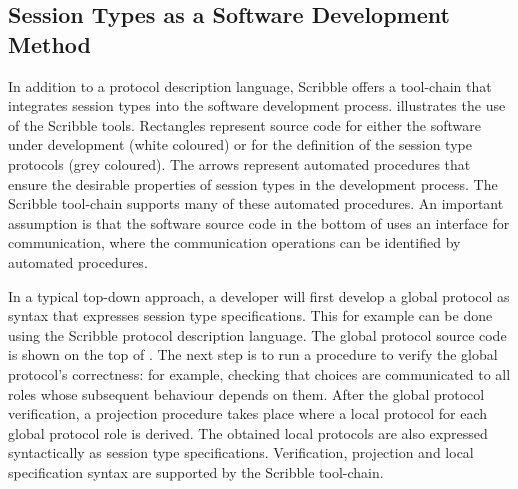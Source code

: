 \subsection{Session Types as a Software Development Method}%
\label{sec:sessions_integrate}

In addition to a protocol description language,
Scribble offers a tool-chain that 
integrates session types into the software
development process.  illustrates the use of the Scribble tools. Rectangles
represent source code for either the software
under development (white coloured) or for the definition
of the session type protocols (grey coloured). 
The arrows
represent automated procedures that ensure
the desirable properties of session types
in the development process. The Scribble
tool-chain supports many of these automated
procedures.
An important assumption
is that the software source code in the
bottom of  uses an interface
for communication, where the communication
operations can be identified by automated
procedures.








In a typical top-down approach, a developer will first develop a global protocol
as syntax that expresses session type specifications.
This for example can be done
using the Scribble protocol description language.
The global protocol source code is shown
on the top of .
The next step is to run a procedure to verify the 
global protocol's correctness: for example, checking that choices are communicated to all roles whose subsequent behaviour depends on them.
After the global protocol verification, a projection
procedure takes place where a local protocol
for each global protocol role is derived.
The obtained local protocols are also expressed
syntactically as session type specifications.
Verification, projection and local specification
syntax are supported by the Scribble tool-chain.


